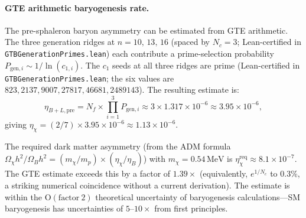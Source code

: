 \documentclass[11pt]{article}
\begin{document}
\paragraph{GTE arithmetic baryogenesis rate.}
The pre-sphaleron baryon asymmetry can be estimated from GTE arithmetic. The three
generation ridges at $n=10,\, 13,\, 16$ (spaced by $N_c=3$; Lean-certified in
\texttt{GTBGenerationPrimes.lean}) each contribute a prime-selection probability
$P_{\mathrm{gen},i} \sim 1/\ln(c_{1,i})$. The $c_1$ seeds at all three ridges are prime
(Lean-certified in \texttt{GTBGenerationPrimes.lean}; the six values are
$823, 2137, 9007, 27817, 46681, 2489143$). The resulting estimate is:
\begin{equation}
\eta_{B+L,\mathrm{pre}} = N_f \times \prod_{i=1}^{3} P_{\mathrm{gen},i}
\approx 3 \times 1.317 \times 10^{-6} \approx 3.95 \times 10^{-6},
\label{eq:gtb}
\end{equation}
giving $\eta_\chi = (2/7) \times 3.95 \times 10^{-6} \approx 1.13 \times 10^{-6}$.

The required dark matter asymmetry (from the ADM formula
$\Omega_\chi h^2 / \Omega_B h^2 = (m_\chi/m_p) \times (\eta_\chi/\eta_B)$) with
$m_\chi = 0.54\,\mathrm{MeV}$ is $\eta_\chi^\mathrm{req} \approx 8.1 \times 10^{-7}$.
The GTE estimate exceeds this by a factor of $1.39\times$ (equivalently, $e^{1/N_c}$
to $0.3\%$, a striking numerical coincidence without a current derivation). The
estimate is within the $\mathrm{O}(\mathrm{factor}\ 2)$ theoretical uncertainty of
baryogenesis calculations---SM baryogenesis has uncertainties of $5$--$10\times$ from
first principles.
\end{document}
